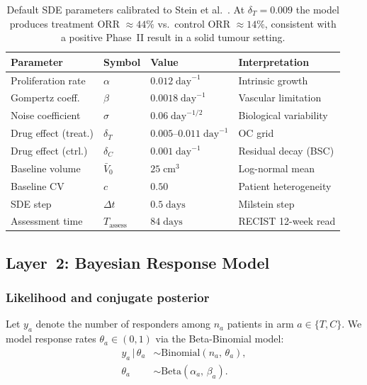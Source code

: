 \documentclass[11pt,a4paper]{article}
\newcommand{\given}{\,|\,}
\begin{document}
\begin{table}[h]
\centering
\begin{tabular}{@{}llll@{}}
\toprule
Parameter & Symbol & Value & Interpretation \\
\midrule
Proliferation rate    & $\alpha$             & $0.012\;\text{day}^{-1}$  & Intrinsic growth \\
Gompertz coeff.       & $\beta$              & $0.0018\;\text{day}^{-1}$ & Vascular limitation \\
Noise coefficient     & $\sigma$             & $0.06\;\text{day}^{-1/2}$ & Biological variability \\
Drug effect (treat.)  & $\delta_T$           & $0.005$--$0.011\;\text{day}^{-1}$ & OC grid \\
Drug effect (ctrl.)   & $\delta_C$           & $0.001\;\text{day}^{-1}$  & Residual decay (BSC) \\
Baseline volume       & $\bar{V}_0$          & $25\;\text{cm}^3$         & Log-normal mean \\
Baseline CV           & $c$                  & $0.50$                    & Patient heterogeneity \\
SDE step              & $\Delta t$           & $0.5\;\text{days}$        & Milstein step \\
Assessment time       & $T_{\text{assess}}$  & $84\;\text{days}$         & RECIST 12-week read \\
\bottomrule
\end{tabular}
\caption{Default SDE parameters calibrated to Stein et al.~\cite{Stein2011}.
At $\delta_T = 0.009$ the model produces treatment ORR $\approx 44\%$ vs.\
control ORR $\approx 14\%$, consistent with a positive Phase~II result in a
solid tumour setting.}
\label{tab:params}
\end{table}
 
\subsection{Layer~2: Bayesian Response Model}
\label{sec:layer2}
 
\subsubsection{Likelihood and conjugate posterior}
 
Let $y_a$ denote the number of responders among $n_a$ patients in arm
$a \in \{T, C\}$. We model response rates $\theta_a \in (0,1)$ via the
Beta-Binomial model:
\begin{align}
  y_a \given \theta_a &\sim \text{Binomial}(n_a,\, \theta_a), \label{eq:likelihood} \\
  \theta_a             &\sim \text{Beta}(\alpha_a,\, \beta_a). \label{eq:prior}
\end{align}
 
\end{document}
